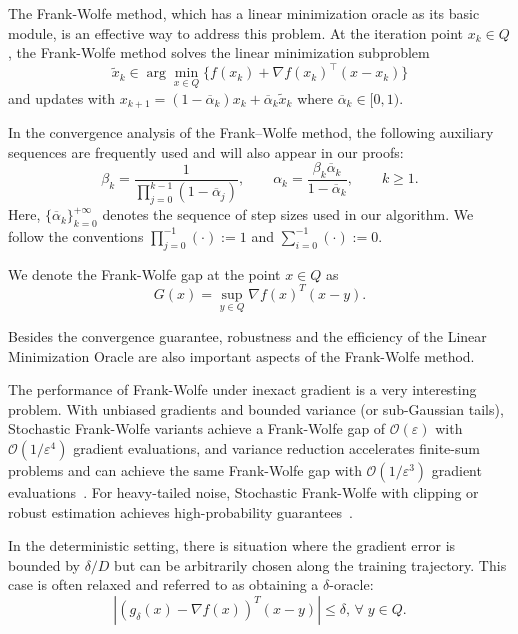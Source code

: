 \documentclass[smallextended]{svjour3}
\begin{document}
The Frank-Wolfe method, which has a linear minimization oracle as its basic module, is an effective way to address this problem. At the iteration point $ x_k\in Q$, the Frank-Wolfe method solves the linear minimization subproblem
\begin{equation*}\label{eq:lmo}
  \tilde{ x}_k\in \arg\min_{ x\in Q}\big\{f( x_k)+\nabla f( x_k)^\top( x- x_k)\big\}
\end{equation*}
and updates with $ x_{k+1}=(1-\overline\alpha_k) x_k+\overline\alpha_k \tilde{ x}_k$ where $\overline\alpha_k\in[0,1)$.

In the convergence analysis of the Frank–Wolfe method, the following auxiliary sequences are frequently used and will also appear in our proofs:
\begin{equation}\label{dos}
\beta_k = \frac{1}{\prod_{j=0}^{k-1} (1 - \overline{\alpha}_j)}, 
\qquad 
\alpha_k = \frac{\beta_k \overline{\alpha}_k}{1 - \overline{\alpha}_k},
\qquad k \ge 1.
\end{equation}
Here, $\{\overline{\alpha}_k\}_{k=0}^{+\infty}$ denotes the sequence of step sizes used in our algorithm.
We follow the conventions $\prod_{j=0}^{-1} (\cdot) := 1$ and $\sum_{i=0}^{-1} (\cdot) := 0$.

We denote the Frank-Wolfe gap at the point $ x \in Q$ as
\[G( x) = \sup_{ y \in Q} \nabla f( x)^T( x -  y).\]


Besides the convergence guarantee, robustness and the efficiency of the Linear Minimization Oracle are also important aspects of the Frank-Wolfe method.

The performance of Frank-Wolfe under inexact gradient is a very interesting problem. With unbiased gradients and bounded variance (or sub-Gaussian tails), Stochastic Frank-Wolfe variants achieve a Frank-Wolfe gap of $\mathcal{O}(\varepsilon)$ with $\mathcal{O}(1/\varepsilon^4)$ gradient evaluations, and variance reduction accelerates finite-sum problems and can achieve the same Frank-Wolfe gap with $\mathcal{O}(1/\varepsilon^3)$ gradient evaluations~\cite{ReddiSFW2016,Goldfarb2017,LuFreund2018,Locatello2019,Zhang2020,sfyraki2025lionsmuonsoptimizationstochastic}. For heavy-tailed noise, Stochastic Frank-Wolfe with clipping or robust estimation achieves high-probability guarantees~\cite{Tang2022,SfyrakiWang2025}.  

In the deterministic setting, there is situation where the gradient error is bounded by $\delta/D$ but can be arbitrarily chosen along the training trajectory. This case is often relaxed and referred to as obtaining a $\delta$-oracle: 
\begin{equation}\label{eq:delta-oracle}\left|(g_{\delta}( x) - \nabla f( x))^T( x - y)\right| \leq \delta,\, \forall \; y \in Q.\end{equation}
\end{document}
